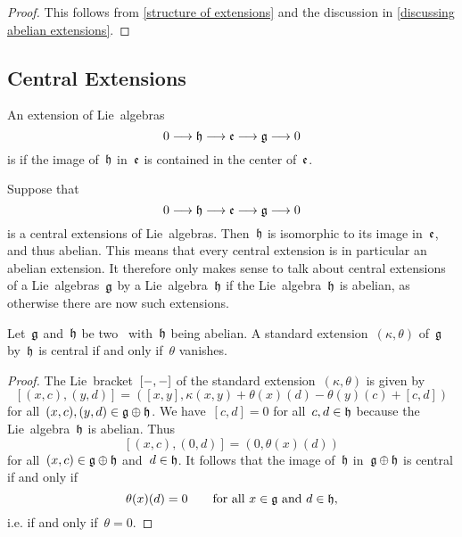 \begin{proof}
	This follows from \cref{structure of extensions} and the discussion in \cref{discussing abelian extensions}.
\end{proof}



\subsection{Central Extensions}

\begin{definition}
	An extension of Lie~algebras
	\[
		0 \to \hlie \to \elie \to \glie \to 0
	\]
	is  if the image of~$\mathfrak{h}$ in~$\mathfrak{e}$ is contained in the center of~$\mathfrak{e}$.
\end{definition}


\begin{remark}
	Suppose that
	\[
		0 \to \hlie \to \elie \to \glie \to 0
	\]
	is a central extensions of Lie~algebras.
	Then~$\mathfrak{h}$ is isomorphic to its image in~$\mathfrak{e}$, and thus abelian.
	This means that every central extension is in particular an abelian extension.
	It therefore only makes sense to talk about central extensions of a Lie~algebras~$\mathfrak{g}$ by a Lie~algebra~$\mathfrak{h}$ if the Lie~algebra~$\mathfrak{h}$ is abelian, as otherwise there are now such extensions.
\end{remark}


\begin{proposition}
	\label{central iff theta is zero}
	Let~$\mathfrak{g}$ and~$\mathfrak{h}$ be two~\liealgebras{$\kf$} with~$\mathfrak{h}$ being abelian.
	A standard extension~$(\kappa, \theta)$ of~$\mathfrak{g}$ by~$\mathfrak{h}$ is central if and only if~$\theta$ vanishes.
\end{proposition}


\begin{proof}
	The Lie~bracket~$[-, -]$ of the standard extension~$(\kappa, \theta)$ is given by
	\[
		[ (x,c), (y,d) ]
		=
		( [x,y], \kappa(x,y) + \theta(x)(d) - \theta(y)(c) + [c,d] )
	\]
	for all~$(x,c), (y,d) \in \mathfrak{g} \oplus \mathfrak{h}$.
	We have~$[c,d] = 0$ for all~$c, d \in \mathfrak{h}$ because the Lie~algebra~$\mathfrak{h}$ is abelian.
	Thus
	\[
		[ (x,c), (0,d) ]
		=
		( 0, \theta(x)(d) )
	\]
	for all~$(x,c) \in \mathfrak{g} \oplus \mathfrak{h}$ and~$d \in \mathfrak{h}$.
	It follows that the image of~$\mathfrak{h}$ in~$\mathfrak{g} \oplus \mathfrak{h}$ is central if and only if
	\[
		\theta(x)(d) = 0
		\qquad
		\text{for all~$x \in \mathfrak{g}$ and~$d \in \mathfrak{h}$,}
	\]
	i.e. if and only if~$\theta = 0$.
\end{proof}




